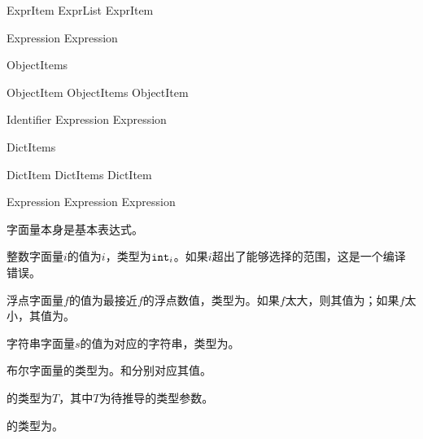 \begin{bnf}
 \br
    ExprItem \br
    ExprList \terminal{,} ExprItem
\end{bnf}

\begin{bnf}
 \br
    Expression \br
     Expression
\end{bnf}

\begin{bnf}
 \br
    \terminal{\{} ObjectItems\bnfq \terminal{\}}
\end{bnf}

\begin{bnf}
 \br
    ObjectItem \br
    ObjectItems \terminal{,} ObjectItem
\end{bnf}

\begin{bnf}
 \br
    Identifier \terminal{:} Expression \br
     Expression
\end{bnf}

\begin{bnf}
 \br
    \terminal{\{|} DictItems\bnfq \terminal{|\}}
\end{bnf}

\begin{bnf}
 \br
    DictItem \br
    DictItems \terminal{,} DictItem
\end{bnf}

\begin{bnf}
 \br
    Expression \terminal{:} Expression \br
     Expression
\end{bnf}

\pnum
字面量本身是基本表达式。

\pnum
整数字面量$i$的值为$i$，类型为$\texttt{int}_i$。如果$i$超出了能够选择的范围，这是一个编译错误。

\pnum
浮点字面量$f$的值为最接近$f$的浮点数值，类型为。如果$f$太大，则其值为；如果$f$太小，其值为。

\pnum
字符串字面量$s$的值为对应的字符串，类型为。

\pnum
布尔字面量的类型为。和分别对应其值。

\pnum
{}的类型为$T$，其中$T$为待推导的类型参数。

\pnum
\tcode{()}的类型为。

